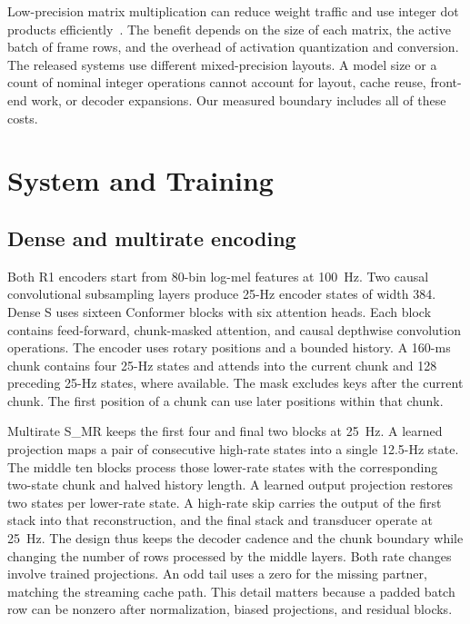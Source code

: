 \documentclass[conference]{IEEEtran}
\begin{document}
Low-precision matrix multiplication can reduce weight traffic and use integer
dot products efficiently~\cite{jacob2018quantization}. The benefit depends on
the size of each matrix, the active batch of frame rows, and the overhead of
activation quantization and conversion. The released systems use different
mixed-precision layouts. A model size or a count of nominal integer operations
cannot account for layout, cache reuse, front-end work, or decoder expansions.
Our measured boundary includes all of these costs.

\section{System and Training}
\label{sec:system}

\subsection{Dense and multirate encoding}

Both R1 encoders start from 80-bin log-mel features at 100~Hz. Two causal
convolutional subsampling layers produce 25-Hz encoder states of width 384.
Dense S uses sixteen Conformer blocks with six attention heads. Each block
contains feed-forward, chunk-masked attention, and causal depthwise
convolution operations. The encoder uses rotary positions and a bounded
history. A 160-ms chunk contains four 25-Hz states and attends into the current
chunk and 128 preceding 25-Hz states, where available. The mask excludes keys
after the current chunk. The first position of a chunk can use later positions
within that chunk.

Multirate S\_MR keeps the first four and final two blocks at 25~Hz. A learned
projection maps a pair of consecutive high-rate states into a single 12.5-Hz
state. The middle ten blocks process those lower-rate states with the
corresponding two-state chunk and halved history length. A learned output
projection restores two states per lower-rate state. A high-rate skip carries
the output of the first stack into that reconstruction, and the final stack and
transducer operate at 25~Hz. The design thus keeps the decoder cadence and
the chunk boundary while changing the number of rows processed by the
middle layers. Both rate changes involve trained projections. An odd tail uses
a zero for the missing partner, matching the streaming cache path. This
detail matters because a padded batch row can be nonzero after normalization,
biased projections, and residual blocks.
\end{document}
